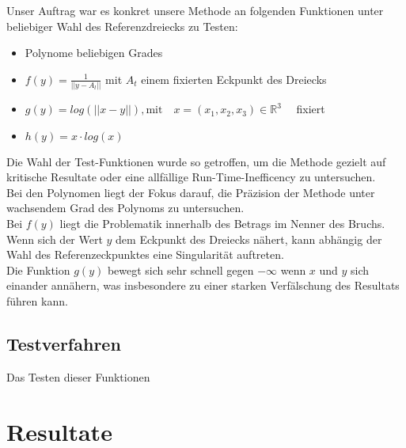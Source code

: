 \documentclass[12pt]{article}
\newcommand{\R}{\mathbb{R}}
\begin{document}
Unser Auftrag war es konkret unsere Methode an folgenden Funktionen unter beliebiger Wahl des Referenzdreiecks zu Testen:




\begin{itemize}
	\item Polynome beliebigen Grades
	\item $f(y) = \frac{1}{||y - A_l||} $ mit $A_t$ einem fixierten Eckpunkt des Dreiecks
	\item $g(y) = log(||x - y||)  , \text{mit} \quad x = (x_1,x_2,x_3) \in \R^3\quad$ fixiert 
	\item $h(y) =x\cdot log(x) $
\end{itemize}

Die Wahl der Test-Funktionen wurde so getroffen, um die Methode gezielt auf kritische Resultate oder eine allfällige Run-Time-Inefficency zu untersuchen.\\
Bei den Polynomen liegt der Fokus darauf, die Präzision der Methode unter wachsendem Grad des Polynoms zu untersuchen.
\\
Bei $f(y)$ liegt die Problematik innerhalb des Betrags im Nenner des Bruchs. Wenn sich der Wert $y$ dem Eckpunkt des Dreiecks nähert, kann abhängig der Wahl des Referenzeckpunktes eine Singularität auftreten.\\
Die Funktion $g(y)$ bewegt sich sehr schnell gegen $-\infty$ wenn $x$ und $y$ sich einander annähern, was insbesondere zu einer starken Verfälschung des Resultats führen kann.\\


\subsection{Testverfahren}

Das Testen dieser Funktionen


\newpage

\section{Resultate}

\newpage
\end{document}

